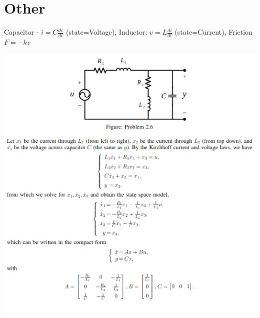 \documentclass[11pt]{article}
\begin{document}
\section{Other}

Capacitor - $i = C \frac{dv}{dt}$ (state=Voltage), Inductor: $v = L \frac{di}{dt}$ (state=Current), Friction $F = -k v$

\begin{center}
    \includegraphics[width=0.99 \linewidth]{10-09-p1.png}
\end{center}
\end{document}
